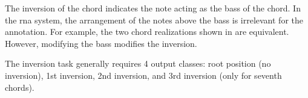 
The inversion of the chord indicates the note acting as the
bass of the chord. In the \gls{rna} system, the arrangement
of the notes above the bass is irrelevant for the
annotation. For example, the two chord realizations shown in
 are equivalent. However, modifying the
bass modifies the inversion.


 The inversion task generally requires 4 output classes:
 root position (no inversion), 1st inversion, 2nd inversion,
 and 3rd inversion (only for seventh chords).
